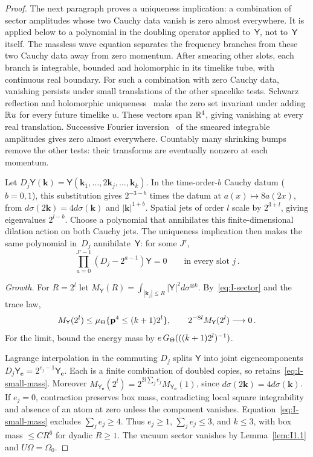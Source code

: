 \begin{proof}
The next paragraph proves a uniqueness implication: a combination of sector amplitudes whose two Cauchy data vanish is zero almost everywhere. It is applied below to a polynomial in the doubling operator applied to~$\mathsf Y$, not to~$\mathsf Y$ itself. The massless wave equation separates the frequency branches from these two Cauchy data away from zero momentum. After smearing other slots, each branch is integrable, bounded and holomorphic in its timelike tube, with continuous real boundary. For such a combination with zero Cauchy data, vanishing persists under small translations of the other spacelike tests. Schwarz reflection and holomorphic uniqueness~\cite[Theorems~11.14 and~10.18]{Rudin1987} make the zero set invariant under adding $\mathbb{R} u$ for every future timelike $u$. These vectors span $\mathbb{R}^4$, giving vanishing at every real translation. Successive Fourier inversion~\cite[Theorem~9.11]{Rudin1987} of the smeared integrable amplitudes gives zero almost everywhere. Countably many shrinking bumps remove the other tests: their transforms are eventually nonzero at each momentum.

Let $D_j\mathsf Y(\boldsymbol k)=\mathsf Y(\mathbf k_1,\ldots,2\mathbf k_j,\ldots,\mathbf k_k)$. In the time-order-$b$ Cauchy datum ($b=0,1$), this substitution gives $2^{-3-b}$ times the datum at $a(x)\mapsto8a(2x)$, from $d\sigma(2\mathbf k)=4d\sigma(\mathbf k)$ and $|\mathbf k|^{1+b}$. Spatial jets of order $l$ scale by $2^{3+l}$, giving eigenvalues $2^{l-b}$. Choose a polynomial that annihilates this finite-dimensional dilation action on both Cauchy jets. The uniqueness implication then makes the same polynomial in~$D_j$ annihilate~$\mathsf Y$: for some $J'$,
\begin{equation}\label{eq:I-doubling}
\prod_{a=0}^{J'-1}(D_j-2^{a-1})\mathsf Y=0\qquad\text{in every slot }j\,.
\end{equation}

\emph{Growth.} For $R=2^l$ let $M_{\mathsf Y}(R)=\int_{|\mathbf k_j|\le R}|\mathsf Y|^2d\sigma^{\otimes k}$. By~\eqref{eq:I-sector} and the trace law,
\begin{equation}\label{eq:I-small-mass}
M_{\mathsf Y}(2^l)\le\mu_{\Theta}\{\mathbf p^4\le(k+1)2^l\},\qquad 2^{-8l}M_{\mathsf Y}(2^l)\longrightarrow0\,.
\end{equation}
For the limit, bound the energy mass by $e\,G_{\Theta}(((k+1)2^l)^{-1})$.

Lagrange interpolation in the commuting $D_j$ splits $\mathsf Y$ into joint eigencomponents $D_j\mathsf Y_{\boldsymbol e}=2^{e_j-1}\mathsf Y_{\boldsymbol e}$. Each is a finite combination of doubled copies, so retains~\eqref{eq:I-small-mass}. Moreover $M_{\mathsf Y_{\boldsymbol e}}(2^l)=2^{2l\sum_j e_j}M_{\mathsf Y_{\boldsymbol e}}(1)$, since $d\sigma(2\mathbf k)=4d\sigma(\mathbf k)$.
If $e_j=0$, contraction preserves box mass, contradicting local square integrability and absence of an atom at zero unless the component vanishes. Equation~\eqref{eq:I-small-mass} excludes $\sum_je_j\ge4$. Thus $e_j\ge1$, $\sum_je_j\le3$, and $k\le3$, with box mass $\le CR^6$ for dyadic $R\ge1$. The vacuum sector vanishes by Lemma~\ref{lem:I1.1} and $U\Omega=\Omega_0$.


\end{proof}
